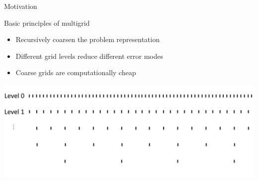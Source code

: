 \documentclass[18pt,xcolor=table]{beamer}
\begin{document}


\begin{frame}{Motivation}
\begin{block}{Basic principles of multigrid}
\begin{itemize}
\item Recursively coarsen the problem representation
\item Different grid levels reduce different error modes
\item Coarse grids are computationally cheap
\end{itemize}
\end{block}

\centering
\includegraphics[width=\textwidth]{figures/compGridCreation1D1}

\end{frame}
\end{document}
